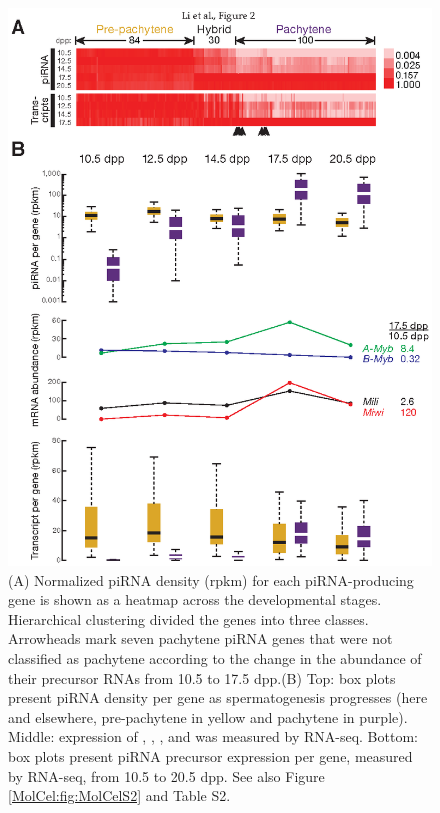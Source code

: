     \begin{figure} %
      \centering 
      \includegraphics{Figures/MolCel/MolCel2013_Fig2.eps}
      \caption[Three Classes of piRNA-Generating Loci]
      {
        (A) Normalized piRNA density (rpkm) for each piRNA-producing gene is shown as a heatmap across the developmental stages. Hierarchical clustering divided the genes into three classes. Arrowheads mark seven pachytene piRNA genes that were not classified as pachytene according to the change in the abundance of their precursor RNAs from 10.5 to 17.5 dpp.(B) Top: box plots present piRNA density per gene as spermatogenesis progresses (here and elsewhere, pre-pachytene in yellow and pachytene in purple). Middle: expression of \amyb{}, \bmyb{}, \mili{}, and \miwi{} was measured by RNA-seq. Bottom: box plots present piRNA precursor expression per gene, measured by RNA-seq, from 10.5 to 20.5 dpp. See also Figure \ref{MolCel:fig:MolCelS2} and Table S2.
        }
      \label{MolCel:fig:MolCelF2}
      \end{figure}
